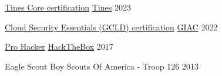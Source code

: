 
\begin{cvhonors}

  \cvhonor
    {\href{https://certification.tines.com/certificate/3FebGM9pnA}{Tines Core certification}}
    {\href{https://www.tines.com/}{Tines}}
    {}
    {2023}

  \cvhonor
    {\href{https://www.credly.com/badges/844480fc-0193-421c-8813-731f345666d6/}{Cloud Security Essentials (GCLD) certification}}
    {\href{https://www.giac.org/}{GIAC}}
    {}
    {2022}

  \cvhonor
    {\href{https://app.hackthebox.com/profile/activity/3716}{Pro Hacker}} %
    {\href{https://www.hackthebox.com/}{HackTheBox}} %
    {} %
    {2017} %

  \cvhonor
    {Eagle Scout} %
    {Boy Scouts Of America - Troop 126} %
    {} %
    {2013} %

\end{cvhonors}